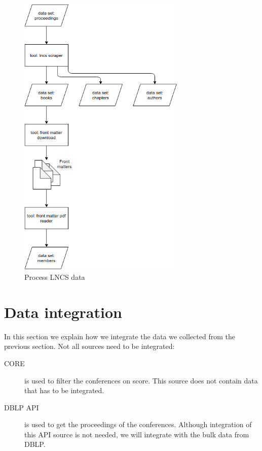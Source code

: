 \documentclass{ou-report}
\begin{document}
\begin{figure}[H]
    \centering
    \includegraphics[width=8cm]{images/data_integration/lncs.drawio.png}
    \caption{Process LNCS data}
    \label{fig:lncs_scraper_datamodel}
\end{figure}



\section{Data integration}
In this section we explain how we integrate the data we collected from the
previous section. Not all sources need to be integrated:
\begin{description}
    \item[CORE] is used to filter the conferences on score. This source
    does not contain data that has to be integrated.
    \item[DBLP API] is used to get the proceedings of the conferences. Although 
    integration of this API source is not needed, we will integrate with 
    the bulk data from DBLP.
\end{description}
\end{document}
